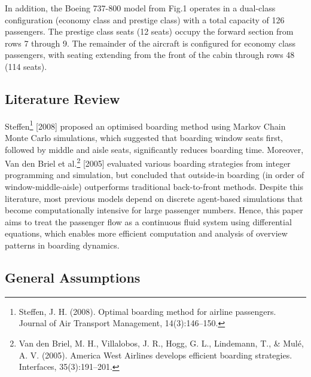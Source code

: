 \documentclass[12pt]{article}
\begin{document}
In addition, the Boeing 737-800 model from Fig.1 operates in a dual-class configuration (economy class and prestige class) with a total capacity of 126 passengers. The prestige class seats (12 seats) occupy the forward section from rows 7 through 9. The remainder of the aircraft is configured for economy class passengers, with seating extending from the front of the cabin through rows 48 (114 seats).

\subsection{Literature Review}

Steffen\footnote{Steffen, J. H. (2008). Optimal boarding method for airline passengers. Journal of Air Transport Management, 14(3):146–150.} [2008] proposed an optimised boarding method using Markov Chain Monte Carlo simulations, which suggested that boarding window seats first, followed by middle and aisle seats, significantly reduces boarding time. Moreover, Van den Briel et al.\footnote{Van den Briel, M. H., Villalobos, J. R., Hogg, G. L., Lindemann, T., \& Mul\'e, A. V. (2005). America West Airlines develops efficient boarding strategies. Interfaces, 35(3):191–201.} [2005] evaluated various boarding strategies from integer programming and simulation, but concluded that outside-in boarding (in order of window-middle-aisle) outperforms traditional back-to-front methods. Despite this literature, most previous models depend on discrete agent-based simulations that become computationally intensive for large passenger numbers. Hence, this paper aims to treat the passenger flow as a continuous fluid system using differential equations, which enables more efficient computation and analysis of overview patterns in boarding dynamics.

\subsection{General Assumptions}
\end{document}
